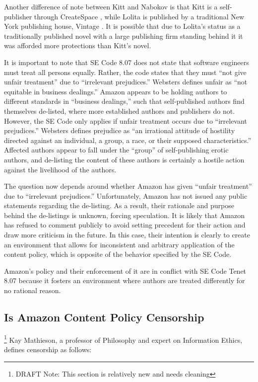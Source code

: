 \documentclass[11pt]{article}
\begin{document}
\begin{multicols}{2}
Another difference of note between Kitt and Nabokov is that Kitt is a self-publisher through CreateSpace \cite{KittSelfPubRevolution}, while Lolita is published by a traditional New York publishing house, Vintage \cite{WorldCatLolita}. It is possible that due to Lolita's status as a traditionally published novel with a large publishing firm standing behind it it was afforded more protections than Kitt's novel.  

It is important to note that SE Code 8.07 does not state that software engineers must treat all persons equally.  Rather, the code states that they must ``not give unfair treatment'' due to ``irrelevant prejudices.'' Websters defines unfair as ``not equitable in business dealings.'' \cite{WebstersOnlineDict}  Amazon appears to be holding authors to different standards in ``business dealings,'' such that self-published authors find themselves de-listed, where more established authors and publishers do not.  However, the SE Code only applies if unfair treatment occurs due to ``irrelevant prejudices.''  Websters defines prejudice as ``an irrational attitude of hostility directed against an individual, a group, a race, or their supposed characteristics.'' \cite{WebsterOnlineDict} Affected authors appear to fall under the ``group'' of self-publishing erotic authors, and de-listing the content of these authors is certainly a hostile action against the livelihood of the authors. 

The question now depends around whether Amazon has given ``unfair treatment'' due to ``irrelevant prejudices.''  Unfortunately, Amazon has not issued any public statements regarding the de-listing.  As a result, their rationale and purpose behind the de-listings is unknown, forcing speculation.  It is likely that Amazon has refused to comment publicly to avoid setting precedent for their action and draw more criticism in the future.  In this case, their intention is clearly to create an environment that allows for inconsistent and arbitrary application of the content policy, which is opposite of the behavior specified by the SE Code.

Amazon's policy and their enforcement of it are in conflict with SE Code Tenet 8.07 because it fosters an environment where authors are treated differently for no rational reason.

\subsection{Is Amazon Content Policy Censorship} \footnote{DRAFT Note: This section is relatively new and needs cleaning}
Kay Mathieson, a professor of Philosophy and expert on Information Ethics, defines censorship as follows:


\end{multicols}
\end{document}
